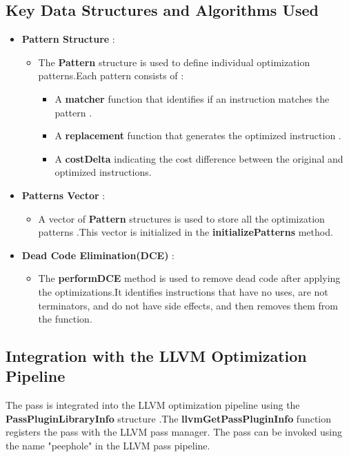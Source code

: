 \documentclass[conference]{IEEEtran}
\begin{document}
\subsection{Key Data Structures and Algorithms Used}

\begin{itemize}
\item \textbf{Pattern Structure} :
\begin{itemize}
\item The \textbf{Pattern} structure is used to define individual optimization
patterns.Each pattern consists of :
\begin{itemize}
	\item A \textbf{
		      matcher} function that identifies if an instruction matches the pattern
	      .
	\item A \textbf{
		      replacement} function that generates the optimized instruction
	      .
	\item A \textbf{costDelta} indicating the cost difference between
	      the original and optimized instructions.
	      \end {itemize}
\end{itemize}

\item \textbf{Patterns Vector} :
\begin {itemize}
\item A vector of \textbf{Pattern} structures is used to store all the optimization patterns
.This vector is initialized in the \textbf{initializePatterns} method.
\end {itemize}

\item \textbf{Dead Code Elimination(DCE)} :
\begin {itemize}
\item The \textbf{performDCE} method is used to remove dead code after applying
the optimizations.It identifies instructions that have no uses,
are not terminators, and do not have side effects,
and then removes them from the function.
\end {itemize}
\end {itemize}

\subsection{Integration with the LLVM Optimization Pipeline}

The pass is integrated into the LLVM optimization pipeline using the \textbf{
	PassPluginLibraryInfo} structure
.The \textbf{llvmGetPassPluginInfo} function registers the pass with the
LLVM pass manager. The pass can be invoked using the name "peephole" in the LLVM pass pipeline.
\end{document}
